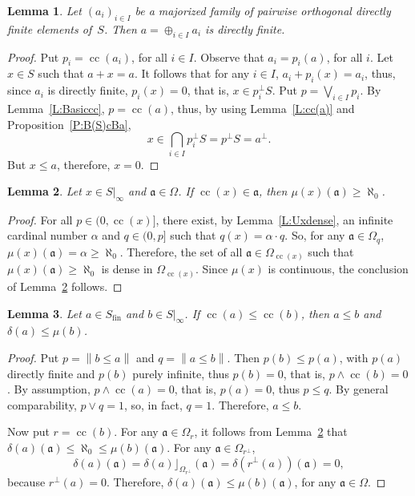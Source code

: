 \documentclass[psamsfonts,reqno]{memo-l}
\theoremstyle{plain}
\newtheorem{lemma}{Lemma}[section]
\theoremstyle{definition}
\theoremstyle{remark}
\numberwithin{equation}{section}
\newcommand{\DI}[1]{#1|_{\infty}}
\newcommand{\fa}{\mathfrak{a}}
\newcommand{\fin}{\mathrm{fin}}
\newcommand{\bv}[1]{\left\|#1\right\|}
\DeclareMathOperator{\cc}{cc}
\newcommand{\famm}[2]{(#1)_{#2}}
\begin{document}
\begin{lemma}\label{L:LocDF}
Let $\famm{a_i}{i\in I}$ be a majorized family of pairwise orthogonal
directly finite elements of~$S$. Then
$a=\oplus_{i\in I}a_i$ is directly finite.
\end{lemma}

\begin{proof}
Put $p_i=\cc(a_i)$, for all $i\in I$. Observe that $a_i=p_i(a)$, for all $i$.
Let $x\in S$ such that $a+x=a$. It follows that for any $i\in I$,
$a_i+p_i(x)=a_i$, thus, since $a_i$ is directly
finite, $p_i(x)=0$, that is,
$x\in p_i^\bot S$. Put $p=\bigvee_{i\in I}p_i$. By Lemma~\ref{L:Basiccc},
$p=\cc(a)$, thus, by using Lemma~\ref{L:cc(a)} and
Proposition~\ref{P:B(S)cBa},
   \[
   x\in\bigcap_{i\in I}p_i^\bot S=p^\bot S=a^\bot.
   \]
But $x\leq a$, therefore, $x=0$.
\end{proof}

\begin{lemma}\label{L:valmuinf}
Let $x\in\DI{S}$ and $\fa\in\Omega$. If $\cc(x)\in\fa$, then
$\mu(x)(\fa)\geq\aleph_0$.
\end{lemma}

\begin{proof}
For all $p\in(0,\cc(x)]$, there exist, by Lemma~\ref{L:Uxdense}, an
infinite cardinal number $\alpha$ and $q\in(0,p]$ such that
$q(x)=\alpha\cdot q$. So, for any $\fa\in\Omega_q$,
$\mu(x)(\fa)=\alpha\geq\aleph_0$. Therefore, the set of all
$\fa\in\Omega_{\cc(x)}$ such that $\mu(x)(\fa)\geq\aleph_0$ is dense in
$\Omega_{\cc(x)}$. Since $\mu(x)$ is continuous, the conclusion of
Lemma~\ref{L:valmuinf} follows.
\end{proof}

\begin{lemma}\label{L:dflepi}
Let $a\in S_\fin$ and $b\in\DI{S}$. If $\cc(a)\leq\cc(b)$, then $a\leq b$
and $\delta(a)\leq\mu(b)$.
\end{lemma}

\begin{proof}
Put $p=\bv{b\leq a}$ and $q=\bv{a\leq b}$. Then $p(b)\leq p(a)$, with $p(a)$
directly finite and $p(b)$ purely infinite, thus
$p(b)=0$, that is,
$p\wedge\cc(b)=0$. By assumption, $p\wedge\cc(a)=0$, that is, $p(a)=0$, thus
$p\leq q$. By general comparability, $p\vee q=1$, so, in fact, $q=1$.
Therefore, $a\leq b$.

Now put $r=\cc(b)$. For any $\fa\in\Omega_r$, it follows from
Lemma~\ref{L:valmuinf} that $\delta(a)(\fa)\leq\aleph_0\leq\mu(b)(\fa)$.
For any $\fa\in\Omega_{r^\bot}$,
   \[
   \delta(a)(\fa)=\delta(a)\rfloor_{\Omega_{r^\bot}}(\fa)=
   \delta(r^\bot(a))(\fa)=0,
   \]
because $r^\bot(a)=0$. Therefore, $\delta(a)(\fa)\leq\mu(b)(\fa)$, for any
$\fa\in\Omega$.
\end{proof}
\end{document}
